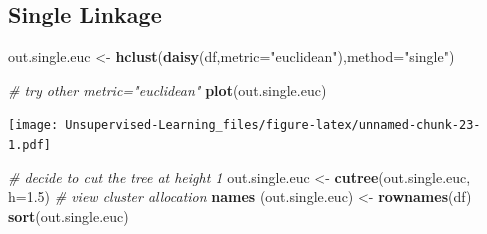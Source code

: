 \documentclass[
]{book}
\newenvironment{Shaded}{\begin{snugshade}}{\end{snugshade}}
\newcommand{\CommentTok}[1]{\textcolor[rgb]{0.56,0.35,0.01}{\textit{#1}}}
\newcommand{\DataTypeTok}[1]{\textcolor[rgb]{0.13,0.29,0.53}{#1}}
\newcommand{\FloatTok}[1]{\textcolor[rgb]{0.00,0.00,0.81}{#1}}
\newcommand{\KeywordTok}[1]{\textcolor[rgb]{0.13,0.29,0.53}{\textbf{#1}}}
\newcommand{\NormalTok}[1]{#1}
\newcommand{\StringTok}[1]{\textcolor[rgb]{0.31,0.60,0.02}{#1}}
\begin{document}
\hypertarget{single-linkage}{%
\subsection{Single Linkage}\label{single-linkage}}

\begin{Shaded}
\begin{Highlighting}[]
\NormalTok{out.single.euc <-}\StringTok{ }\KeywordTok{hclust}\NormalTok{(}\KeywordTok{daisy}\NormalTok{(df,}\DataTypeTok{metric=}\StringTok{"euclidean"}\NormalTok{),}\DataTypeTok{method=}\StringTok{"single"}\NormalTok{) }

\CommentTok{# try other metric="euclidean"}
\KeywordTok{plot}\NormalTok{(out.single.euc)}
\end{Highlighting}
\end{Shaded}

\texttt{[image: Unsupervised-Learning\_files/figure-latex/unnamed-chunk-23-1.pdf]}

\begin{Shaded}
\begin{Highlighting}[]
 \CommentTok{# decide to cut the tree at height 1}
\NormalTok{out.single.euc <-}\StringTok{ }\KeywordTok{cutree}\NormalTok{(out.single.euc, }\DataTypeTok{h=}\FloatTok{1.5}\NormalTok{)}
 \CommentTok{# view cluster allocation}
\KeywordTok{names}\NormalTok{ (out.single.euc) <-}\StringTok{ }\KeywordTok{rownames}\NormalTok{(df)}
\KeywordTok{sort}\NormalTok{(out.single.euc)}
\end{Highlighting}
\end{Shaded}
\end{document}
